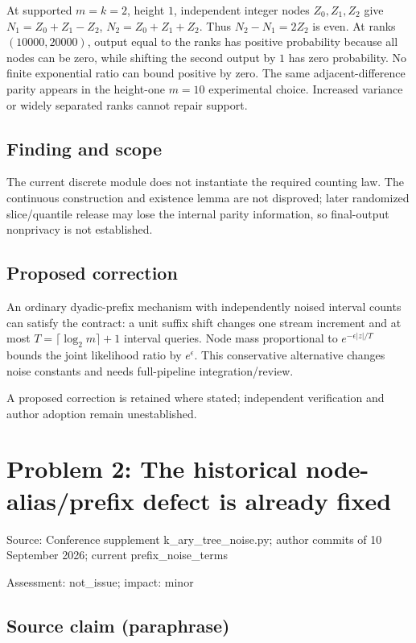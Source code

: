 \documentclass[11pt]{article}
\begin{document}
At supported \(m=k=2\), height \(1\), independent integer nodes \(Z_0,Z_1,Z_2\) give \(N_1=Z_0+Z_1-Z_2\), \(N_2=Z_0+Z_1+Z_2\). Thus \(N_2-N_1=2Z_2\) is even. At ranks \((10000,20000)\), output equal to the ranks has positive probability because all nodes can be zero, while shifting the second output by \(1\) has zero probability. No finite exponential ratio can bound positive by zero. The same adjacent-difference parity appears in the height-one \(m=10\) experimental choice. Increased variance or widely separated ranks cannot repair support.

\subsection*{Finding and scope}

The current discrete module does not instantiate the required counting law. The continuous construction and existence lemma are not disproved; later randomized slice/quantile release may lose the internal parity information, so final-output nonprivacy is not established.

\subsection*{Proposed correction}

An ordinary dyadic-prefix mechanism with independently noised interval counts can satisfy the contract: a unit suffix shift changes one stream increment and at most \(T=\lceil\log_2m\rceil+1\) interval queries. Node mass proportional to \(e^{-\epsilon|z|/T}\) bounds the joint likelihood ratio by \(e^\epsilon\). This conservative alternative changes noise constants and needs full-pipeline integration/review.

A proposed correction is retained where stated; independent verification and author adoption remain unestablished.

\section*{Problem 2: The historical node-alias/prefix defect is already fixed}

Source: Conference supplement k\_ary\_tree\_noise.py; author commits of 10 September 2026; current prefix\_noise\_terms

Assessment: not\_issue; impact: minor

\subsection*{Source claim (paraphrase)}
\end{document}
